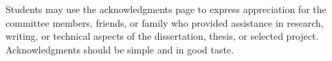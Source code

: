 Students may use the acknowledgments page to express appreciation for
the committee members, friends, or family who provided assistance in
research, writing, or technical aspects of the dissertation, thesis,
or selected project.  Acknowledgments should be simple and in good
taste.
